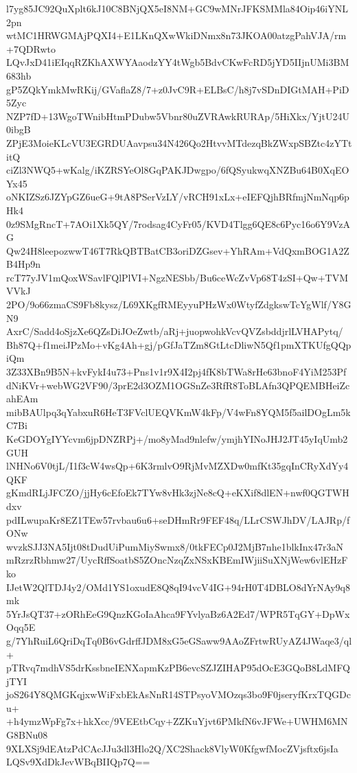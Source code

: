 l7yg85JC92QuXplt6kJ10C8BNjQX5eI8NM+GC9wMNrJFKSMMla84Oip46iYNL2pn
wtMC1HRWGMAjPQXI4+E1LKnQXwWkiDNmx8n73JKOA00atzgPahVJA/rm+7QDRwto
LQvJxD41iEIqqRZKhAXWYAaodzYY4tWgb5BdvCKwFcRD5jYD5IIjnUMi3BM683hb
gP5ZQkYmkMwRKij/GVaflaZ8/7+z0JvC9R+ELBsC/h8j7vSDnDIGtMAH+PiD5Zyc
NZP7fD+13WgoTWnibHtmPDubw5Vbnr80uZVRAwkRURAp/5HiXkx/YjtU24U0ibgB
ZPjE3MoieKLcVU3EGRDUAavpsu34N426Qo2HtvvMTdezqBkZWxpSBZtc4zYTtitQ
ciZl3NWQ5+wKalg/iKZRSYeOl8GqPAKJDwgpo/6fQSyukwqXNZBu64B0XqEOYx45
oNKIZSz6JZYpGZ6ueG+9tA8PSerVzLY/vRCH91xLx+eIEFQjhBRfmjNmNqp6pHk4
0z9SMgRncT+7AOi1Xk5QY/7rodsag4CyFr05/KVD4Tlgg6QE8c6Pyc16o6Y9VzAG
Qw24H8leepozwwT46T7RkQBTBatCB3oriDZGsev+YhRAm+VdQxmBOG1A2ZB4Hp9n
rcT77yJV1mQoxWSavlFQlPlVI+NgzNESbb/Bu6ceWcZvVp68T4zSI+Qw+TVMVVkJ
2PO/9o66zmaCS9Fb8kysz/L69XKgfRMEyyuPHzWx0WtyfZdgkswTcYgWlf/Y8GN9
AxrC/Sadd4oSjzXe6QZsDiJOeZwtb/aRj+juopwohkVcvQVZsbddjrlLVHAPytq/
Bh87Q+f1meiJPzMo+vKg4Ah+gj/pGfJaTZm8GtLtcDliwN5Qf1pmXTKUfgQQpiQm
3Z33XBn9B5N+kvFykI4u73+Pns1v1r9X4I2pj4fK8bTWa8rHe63bnoF4YiM253Pf
dNiKVr+webWG2VF90/3prE2d3OZM1OGSnZe3RfR8ToBLAfn3QPQEMBHeiZcahEAm
mibBAUlpq3qYabxuR6HeT3FVclUEQVKmW4kFp/V4wFn8YQM5f5ailDOgLm5kC7Bi
KeGDOYgIYYcvm6jpDNZRPj+/mo8yMad9nlefw/ymjhYINoJHJ2JT45yIqUmb2GUH
lNHNo6V0tjL/I1f3cW4wsQp+6K3rmlvO9RjMvMZXDw0mfKt35gqInCRyXdYy4QKF
gKmdRLjJFCZO/jjHy6cEfoEk7TYw8vHk3zjNe8cQ+eKXif8dlEN+nwf0QGTWHdxv
pdILwupaKr8EZ1TEw57rvbau6u6+seDHmRr9FEF48q/LLrCSWJhDV/LAJRp/fONw
wvzkSJJ3NA5Ijt08tDudUiPumMiySwmx8/0tkFECp0J2MjB7nhe1blkInx47r3aN
mRzrzRbhmw27/UycRffSoatbS5ZOncNzqZxNSxKBEmIWjiiSuXNjWew6vlEHzFko
IJetW2QlTDJ4y2/OMd1YS1oxudE8Q8qI94vcV4IG+94rH0T4DBLO8dYrNAy9q8mk
5YrJsQT37+zORhEeG9QnzKGoIaAhca9FYvlyaBz6A2Ed7/WPR5TqGY+DpWxOqq5E
g/7YhRuiL6QriDqTq0B6vGdrffJDM8xG5eGSaww9AAoZFrtwRUyAZ4JWaqe3/ql+
pTRvq7mdhVS5drKssbneIENXapmKzPB6evcSZJZIHAP95dOcE3GQoB8LdMFQjTYI
joS264Y8QMGKqjxwWiFxbEkAsNnR14STPsyoVMOzqs3bo9F0jseryfKrxTQGDcu+
+h4ymzWpFg7x+hkXcc/9VEEtbCqy+ZZKuYjvt6PMkfN6vJFWe+UWHM6MNG8BNu08
9XLXSj9dEAtzPdCAcJJu3dl3Hlo2Q/XC2Shack8VlyW0KfgwfMocZVjsftx6jsIa
LQSv9XdDkJevWBqBIIQp7Q==
